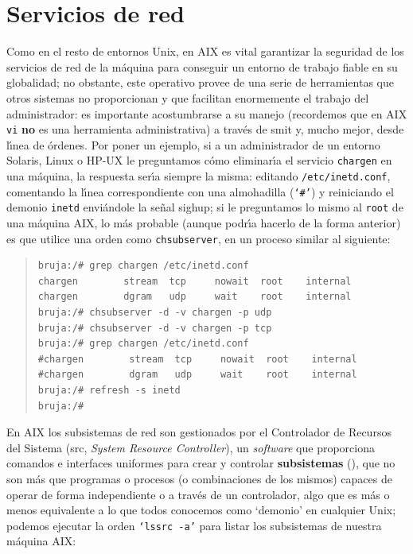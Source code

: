 \section{Servicios de red}
Como en el resto de entornos Unix, en AIX es vital garantizar la seguridad de
los servicios de red de la m\'aquina para conseguir un entorno de trabajo 
fiable en su globalidad; no obstante, este operativo provee de una serie de 
herramientas que otros sistemas no proporcionan y que facilitan enormemente el
trabajo del administrador: es importante acostumbrarse a su manejo (recordemos
que en AIX {\tt vi} {\bf no} es una herramienta administrativa) a trav\'es de
{\sc smit} y, mucho mejor, desde l\'{\i}nea de \'ordenes. Por poner un ejemplo,
si a un administrador de un entorno Solaris, Linux o HP-UX le preguntamos 
c\'omo eliminar\'{\i}a el servicio {\tt chargen} en una m\'aquina, la respuesta
ser\'{\i}a siempre la misma: editando {\tt /etc/inetd.conf}, comentando la
l\'{\i}nea correspondiente con una almohadilla ({\tt `\#'}) y reiniciando el
demonio {\tt inetd} envi\'andole la se\~nal {\sc sighup}; si le preguntamos lo
mismo al {\tt root} de una m\'aquina AIX, lo m\'as probable (aunque podr\'{\i}a
hacerlo de la forma anterior) es que utilice una orden como {\tt chsubserver}, 
en un proceso similar al siguiente:
\begin{quote}
\begin{verbatim}
bruja:/# grep chargen /etc/inetd.conf
chargen        stream  tcp     nowait  root    internal
chargen        dgram   udp     wait    root    internal
bruja:/# chsubserver -d -v chargen -p udp
bruja:/# chsubserver -d -v chargen -p tcp
bruja:/# grep chargen /etc/inetd.conf
#chargen        stream  tcp     nowait  root    internal
#chargen        dgram   udp     wait    root    internal
bruja:/# refresh -s inetd
bruja:/#
\end{verbatim}
\end{quote}
En AIX los subsistemas de red son gestionados por el Controlador de Recursos del
Sistema ({\sc src}, {\it System Resource Controller}), un {\it software} que
proporciona comandos e interfaces uniformes para crear y controlar {\bf 
subsistemas} (\cite{kn:ibm97}), que no son m\'as que programas o procesos (o
combinaciones de los mismos) capaces de operar de forma independiente o a 
trav\'es de un controlador, algo que es m\'as o menos equivalente a lo que 
todos conocemos como `demonio' en cualquier Unix; podemos ejecutar la orden 
{\tt `lssrc -a'} para listar los subsistemas de nuestra m\'aquina AIX:
